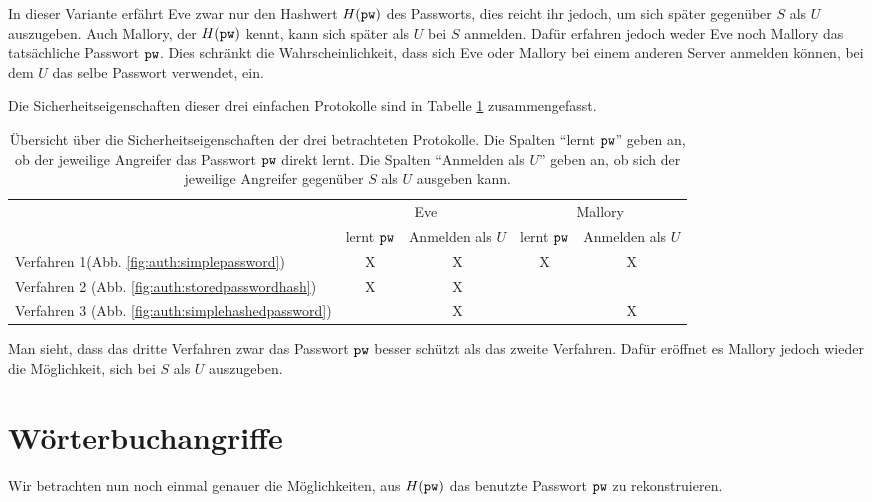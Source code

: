 In dieser Variante erfährt Eve zwar nur den Hashwert $H(\texttt{pw})$ des
Passworts, dies reicht ihr jedoch, um sich später gegenüber $S$ als $U$
auszugeben. Auch Mallory, der $H(\texttt{pw})$ kennt, kann sich später als $U$
bei $S$ anmelden. Dafür erfahren jedoch weder Eve noch Mallory das
tatsächliche Passwort $\texttt{pw}$. Dies schränkt die Wahrscheinlichkeit, dass
sich Eve oder Mallory bei einem anderen Server anmelden können, bei dem
$U$ das selbe Passwort verwendet, ein.

Die Sicherheitseigenschaften dieser drei einfachen Protokolle sind in
Tabelle \ref{table:auth:overview} zusammengefasst.\\
\begin{table}[h]
  \begin{center}
    \begin{tabular}{l||c|c|c|c} 
      & \multicolumn{2}{c|}{Eve} & \multicolumn{2}{|c}{Mallory}\\ 
      & lernt $\texttt{pw}$ & Anmelden als $U$ & lernt $\texttt{pw}$ & Anmelden als $U$
      \\\hline \hline 
      Verfahren 1(Abb. \ref{fig:auth:simplepassword}) & X & X & X & X \\\hline
      Verfahren 2 (Abb. \ref{fig:auth:storedpasswordhash}) & X & X & & \\\hline
      Verfahren 3 (Abb. \ref{fig:auth:simplehashedpassword}) & & X & & X \\
    \end{tabular}
  \end{center}
  \caption{Übersicht über die Sicherheitseigenschaften der drei
    betrachteten Protokolle. Die Spalten "`lernt $\texttt{pw}$"' geben an, ob der
    jeweilige Angreifer das Passwort $\texttt{pw}$ direkt lernt. Die Spalten
    "`Anmelden als $U$"' geben an, ob sich der jeweilige Angreifer gegenüber
    $S$ als $U$ ausgeben kann.}
  \label{table:auth:overview}
\end{table}

Man sieht, dass das dritte Verfahren zwar das Passwort $\texttt{pw}$ besser
schützt als das zweite Verfahren. Dafür eröffnet es Mallory jedoch
wieder die Möglichkeit, sich bei $S$ als $U$ auszugeben.

\section{Wörterbuchangriffe}
Wir betrachten nun noch einmal genauer die Möglichkeiten, aus $H(\texttt{pw})$
das benutzte Passwort $\texttt{pw}$ zu rekonstruieren.

